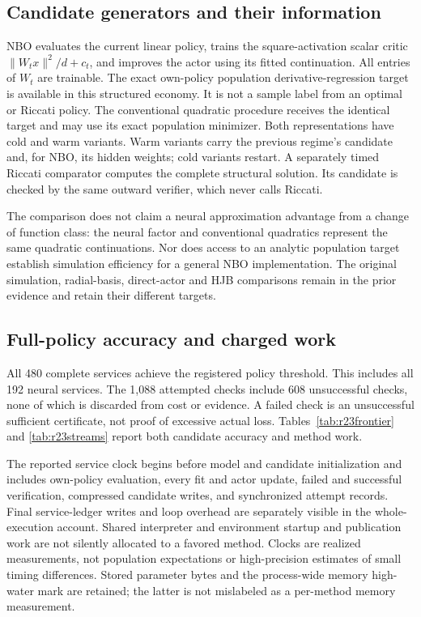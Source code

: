 \subsection{Candidate generators and their information}
NBO evaluates the current linear policy, trains the square-activation scalar
critic $\|W_tx\|^2/d+c_t$, and improves the actor using its fitted
continuation. All entries of $W_t$ are trainable. The exact own-policy
population derivative-regression target is available in this structured
economy. It is not a sample label from an optimal or Riccati policy.
The conventional quadratic procedure receives the identical target and may
use its exact population minimizer. Both representations have cold and
warm variants. Warm variants carry the previous regime's candidate and,
for NBO, its hidden weights; cold variants restart. A separately timed
Riccati comparator computes the complete structural solution. Its candidate
is checked by the same outward verifier, which never calls Riccati.

The comparison does not claim a neural approximation advantage from a
change of function class: the neural factor and conventional quadratics
represent the same quadratic continuations. Nor does access to an analytic
population target establish simulation efficiency for a general NBO
implementation. The original simulation, radial-basis, direct-actor and HJB
comparisons remain in the prior evidence and retain their different targets.

\subsection{Full-policy accuracy and charged work}
All 480 complete services achieve the registered policy threshold. This
includes all 192 neural services. The 1,088 attempted checks include 608
unsuccessful checks, none of which is discarded from cost or evidence.
A failed check is an unsuccessful sufficient certificate, not proof of
excessive actual loss. Tables~\ref{tab:r23frontier} and
\ref{tab:r23streams} report both candidate accuracy and method work.

The reported service clock begins before model and candidate initialization
and includes own-policy evaluation, every fit and actor update, failed and
successful verification, compressed candidate writes, and synchronized
attempt records. Final service-ledger writes and loop overhead are separately
visible in the whole-execution account. Shared interpreter and environment
startup and publication work are not silently allocated to a favored
method. Clocks are realized measurements, not population expectations or
high-precision estimates of small timing differences. Stored parameter
bytes and the process-wide memory high-water mark are retained; the latter
is not mislabeled as a per-method memory measurement.

